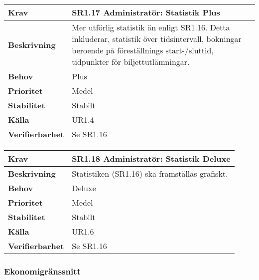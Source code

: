 \documentclass[a4paper, twoside, 11pt, titlepage]{article}
\begin{document}
		\begin{tabular} { p{2.6cm} p{12.5cm} }
			\hline
			\sffamily\textbf{Krav} & \sffamily\textbf{SR1.17 Administratör: Statistik Plus } \\
			\hline
			\sffamily\textbf{Beskrivning} & Mer utförlig statistik än enligt SR1.16. Detta inkluderar, statistik över tidsintervall, bokningar beroende på föreställnings start-/sluttid, tidpunkter för biljettutlämningar.  \\
			\hline
			\sffamily\textbf{Behov} & Plus  \\
			\hline
			\sffamily\textbf{Prioritet} & Medel  \\
			\hline
			\sffamily\textbf{Stabilitet} & Stabilt  \\
			\hline
			\sffamily\textbf{Källa} & UR1.4  \\
			\hline
			\sffamily\textbf{Verifierbarhet} & Se SR1.16  \\
			\hline
		\end{tabular}
		\vspace{6mm}

		\begin{tabular} { p{2.6cm} p{12.5cm} }
			\hline
			\sffamily\textbf{Krav} & \sffamily\textbf{SR1.18 Administratör: Statistik Deluxe } \\
			\hline
			\sffamily\textbf{Beskrivning} & Statistiken (SR1.16) ska framställas grafiskt.  \\
			\hline
			\sffamily\textbf{Behov} & Deluxe  \\
			\hline
			\sffamily\textbf{Prioritet} & Medel  \\
			\hline
			\sffamily\textbf{Stabilitet} & Stabilt  \\
			\hline
			\sffamily\textbf{Källa} & UR1.6  \\
			\hline
			\sffamily\textbf{Verifierbarhet} & Se SR1.16  \\
			\hline
		\end{tabular}


		\subsubsection{Ekonomigränssnitt}
\end{document}
